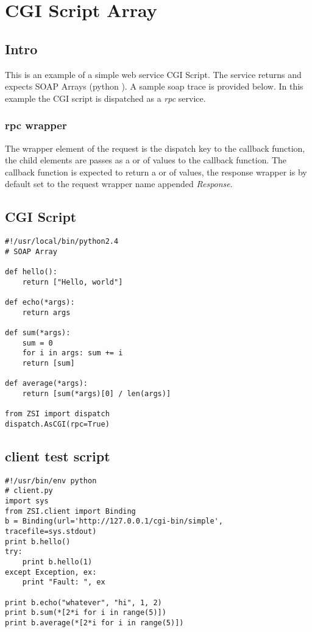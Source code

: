 \chapter{CGI Script Array}

\section{Intro} This is an example of a simple web service CGI Script.  The
service returns and expects SOAP Arrays (python ).  A sample soap
trace is provided below.  In this example the CGI script is dispatched as a
\emph{rpc} service.

\subsection{rpc wrapper} The wrapper element of the request is the dispatch key
to the callback function, the child elements are passes as a  or
 of values to the callback function.  The callback function is
expected to return a  or  of values, the response
wrapper is by default set to the request wrapper name appended \emph{Response}.

\section{CGI Script}
\begin{verbatim}
#!/usr/local/bin/python2.4
# SOAP Array

def hello():
    return ["Hello, world"]

def echo(*args):
    return args

def sum(*args):
    sum = 0
    for i in args: sum += i
    return [sum]

def average(*args):
    return [sum(*args)[0] / len(args)]

from ZSI import dispatch
dispatch.AsCGI(rpc=True)
\end{verbatim}

\section{client test script}
\begin{verbatim}
#!/usr/bin/env python
# client.py
import sys
from ZSI.client import Binding
b = Binding(url='http://127.0.0.1/cgi-bin/simple', tracefile=sys.stdout)
print b.hello()
try:
    print b.hello(1)
except Exception, ex:
    print "Fault: ", ex

print b.echo("whatever", "hi", 1, 2)
print b.sum(*[2*i for i in range(5)])
print b.average(*[2*i for i in range(5)])
\end{verbatim}

